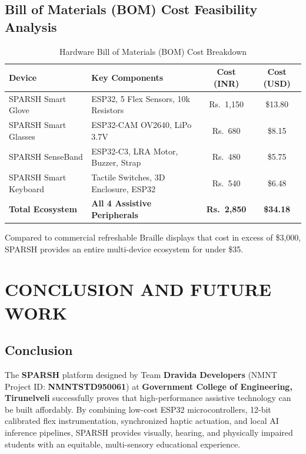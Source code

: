 \documentclass[12pt,a4paper]{report}
\begin{document}
\section{Bill of Materials (BOM) Cost Feasibility Analysis}
\begin{table}[htbp]
    \centering
    \caption{Hardware Bill of Materials (BOM) Cost Breakdown}
    \vspace{0.2cm}
    \renewcommand{\arraystretch}{1.2}
    \begin{tabular}{|l|l|c|c|}
        \hline
        \textbf{Device} & \textbf{Key Components} & \textbf{Cost (INR)} & \textbf{Cost (USD)} \\ \hline
        SPARSH Smart Glove & ESP32, 5 Flex Sensors, 10k Resistors & Rs.~1,150 & \$13.80 \\ \hline
        SPARSH Smart Glasses & ESP32-CAM OV2640, LiPo 3.7V & Rs.~680 & \$8.15 \\ \hline
        SPARSH SenseBand & ESP32-C3, LRA Motor, Buzzer, Strap & Rs.~480 & \$5.75 \\ \hline
        SPARSH Smart Keyboard & Tactile Switches, 3D Enclosure, ESP32 & Rs.~540 & \$6.48 \\ \hline
        \textbf{Total Ecosystem} & \textbf{All 4 Assistive Peripherals} & \textbf{Rs.~2,850} & \textbf{\$34.18} \\ \hline
    \end{tabular}
\end{table}
Compared to commercial refreshable Braille displays that cost in excess of \$3,000, SPARSH provides an entire multi-device ecosystem for under \$35.

\chapter{CONCLUSION AND FUTURE WORK}

\section{Conclusion}
The \textbf{SPARSH} platform designed by Team \textbf{Dravida Developers} (NMNT Project ID: \textbf{NMNTSTD950061}) at \textbf{Government College of Engineering, Tirunelveli} successfully proves that high-performance assistive technology can be built affordably. By combining low-cost ESP32 microcontrollers, 12-bit calibrated flex instrumentation, synchronized haptic actuation, and local AI inference pipelines, SPARSH provides visually, hearing, and physically impaired students with an equitable, multi-sensory educational experience.
\end{document}
